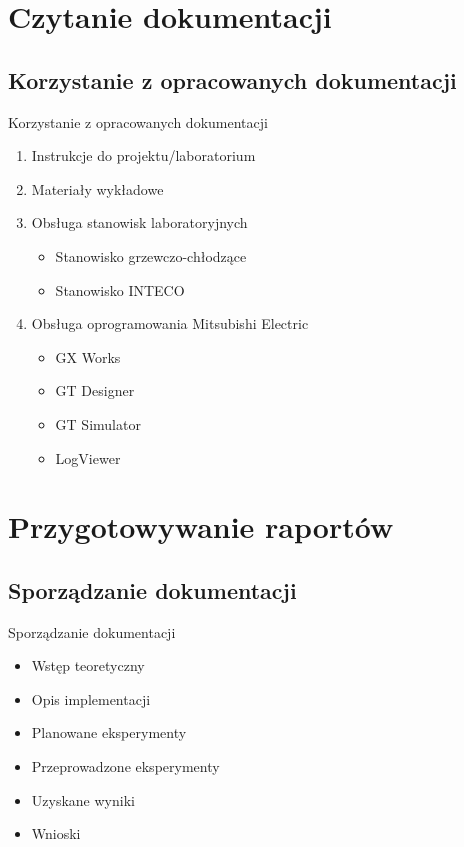 \documentclass{beamer}
\begin{document}
\section{Czytanie dokumentacji}

	\subsection{Korzystanie z opracowanych dokumentacji}
	\begin{frame}{Korzystanie z opracowanych dokumentacji}
		\begin{enumerate}
			\item Instrukcje do projektu/laboratorium
			\item Materiały wykładowe
			\item Obsługa stanowisk laboratoryjnych
			\begin{itemize}
				\item Stanowisko grzewczo-chłodzące
				\item Stanowisko INTECO
			\end{itemize}
			\item Obsługa oprogramowania Mitsubishi Electric
			\begin{itemize}
				\item GX Works
				\item GT Designer
				\item GT Simulator
				\item LogViewer
			\end{itemize}
		\end{enumerate}
	\end{frame}


\section{Przygotowywanie raportów}
\subsection{Sporządzanie dokumentacji}
\begin{frame}{Sporządzanie dokumentacji}
	\begin{itemize}
		\item{Wstęp teoretyczny}
		\item{Opis implementacji}
		\item{Planowane eksperymenty}
		\item{Przeprowadzone eksperymenty}
		\item{Uzyskane wyniki}
		\item{Wnioski}
	\end{itemize}
\end{frame}
\end{document}
